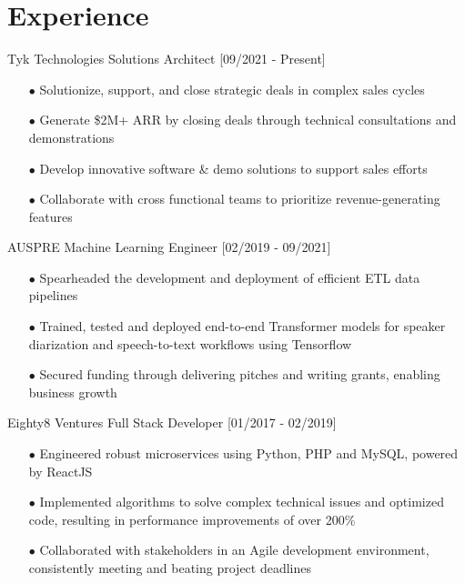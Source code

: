 \documentclass[]{twentysecondcv}
\begin{document}


\section{Experience}
\vspace{-5px}

\begin{twenty}
  \twentyitem
    {Tyk Technologies}
    {Solutions Architect}
    {[09/2021 - Present]}
    {
    \begin{itemize}
        \item[$\bullet$] Solutionize, support, and close strategic deals in complex sales cycles 
        \item[$\bullet$] Generate \$2M+ ARR by closing deals through technical consultations and demonstrations 
        \item[$\bullet$] Develop innovative software \& demo solutions to support sales efforts 
        \item[$\bullet$] Collaborate with cross functional teams to prioritize revenue-generating features
    \end{itemize}
    }
  \twentyitem
    {AUSPRE}
    {Machine Learning Engineer}
    {[02/2019 - 09/2021]}
    {
    \begin{itemize}
        \item[$\bullet$] Spearheaded the development and deployment of efficient ETL data pipelines
        \item[$\bullet$] Trained, tested and deployed end-to-end Transformer models for speaker diarization and speech-to-text workflows using Tensorflow
        \item[$\bullet$] Secured funding through delivering pitches and writing grants, enabling business growth
    \end{itemize}
    }
\twentyitem
    {Eighty8 Ventures}
    {Full Stack Developer}
    {[01/2017 - 02/2019]}
    {
    \begin{itemize}
        \item[$\bullet$] Engineered robust microservices using Python, PHP and MySQL, powered by ReactJS
        \item[$\bullet$] Implemented algorithms to solve complex technical issues and optimized code, resulting in performance improvements of over 200\%
        \item[$\bullet$] Collaborated with stakeholders in an Agile development environment, consistently meeting and beating project deadlines
    \end{itemize}
    }


\end{twenty}
\end{document}
